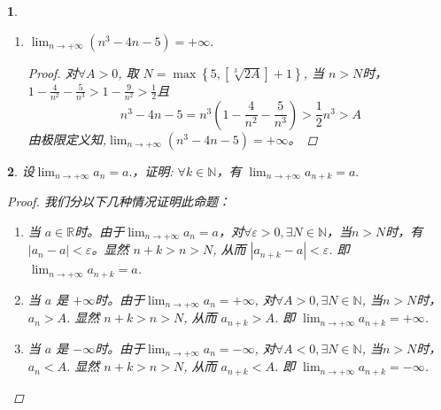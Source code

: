 \documentclass[utf8]{book}
\newtheorem{example}{}[section]             %
\begin{document}
\begin{example}
\begin{enumerate}
		\begin{proof}
         对$\forall \varepsilon > 0$, 取 $N = \left [ \frac{1}{\varepsilon}\right ] + 1$, 当 $n > N$时，
         \begin{equation*}
         \begin{aligned}
         \left | a_n - 1\right | &<
         \begin{cases}
         \displaystyle\frac{1}{n}, \text{n 为偶数，}\\
         \displaystyle\frac{1}{\sqrt{n^2 + n} + n} , \text{n 为奇数}
		\end{cases}\\
		&< \frac{1}{n} < \varepsilon
		\end{aligned}
		\end{equation*}
        由极限定义知,$\displaystyle\lim_{n\to +\infty}a_n = 1$.  
        \end{proof} 
        
        \item $\displaystyle \lim_{n\to +\infty}(n^3 - 4n - 5) = +\infty.$		
		\begin{proof}
         对$\forall A > 0$, 取 $N = \max\left\{5, \left [ \sqrt[3]{2A}\right ] + 1\right\}$, 当 $n > N$时，
         $1 - \frac{4}{n^2} - \frac{5}{n^3} > 1 - \frac{9}{n^2} > \frac{1}{2}$且 $$n^3 - 4n - 5 = n^3(1 - \frac{4}{n^2} - \frac{5}{n^3}) > \frac{1}{2}n^3 > A$$
        由极限定义知,$\displaystyle\lim_{n\to +\infty}(n^3 - 4n - 5) = +\infty$。  
        \end{proof}  
\end{enumerate}
\end{example}
\begin{example}
设$\displaystyle \lim_{n\to +\infty}a_n = a.$，证明: $\forall k \in \mathbb{N}$，有 $\displaystyle \lim_{n\to +\infty}a_{n+k} = a.$
\begin{proof}
我们分以下几种情况证明此命题：
\renewcommand\labelenumi{\normalfont(\theenumi)}
\begin{enumerate}
\item 当 $a\in \mathbb{R}$时。由于$\displaystyle \lim_{n\to +\infty}a_n = a$，对$\forall \varepsilon > 0, \exists N \in \mathbb{N}$，当$n > N$时，有$\left | a_n - a\right | < \varepsilon$。显然 $n+k > n > N$, 从而 $\left | a_{n + k} - a\right | < \varepsilon$. 即 $\displaystyle \lim_{n\to +\infty}a_{n+k} = a$.
\item 当 $a$ 是 $+\infty$时。由于$\displaystyle \lim_{n\to +\infty}a_n = +\infty$, 对$\forall A > 0, \exists N \in \mathbb{N}$, 当$n > N$时， $a_n > A$. 显然 $n+k > n > N$, 从而 $a_{n + k} > A$. 即 $\displaystyle \lim_{n\to +\infty}a_{n+k} = +\infty$.
\item 当 $a$ 是 $-\infty$时。由于$\displaystyle \lim_{n\to +\infty}a_n = -\infty$, 对$\forall A < 0, \exists N \in \mathbb{N}$, 当$n > N$时， $a_n < A$. 显然 $n+k > n > N$, 从而 $a_{n + k} < A$. 即 $\displaystyle \lim_{n\to +\infty}a_{n+k} = -\infty$.
\end{enumerate}
\end{proof}
\end{example}
\end{document}
